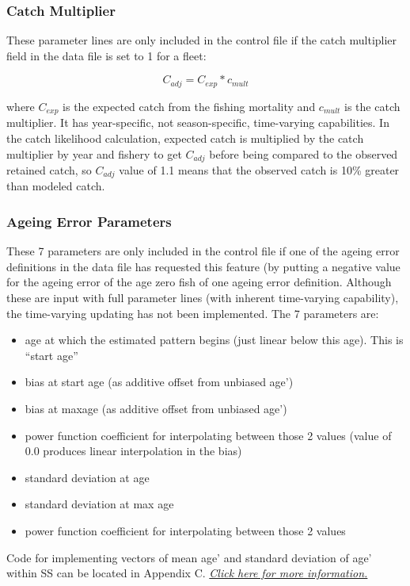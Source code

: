 \subsubsection{Catch Multiplier}
These  parameter lines are only included in the control file if the catch multiplier field in the data file is set to 1 for a fleet:

\begin{equation}
C_{adj} = C_{exp} * c_{mult}
\end{equation}

\noindent where $C_{exp}$ is the expected catch from the fishing mortality and $c_{mult}$ is the catch multiplier. It has year-specific, not season-specific, time-varying capabilities.  In the catch likelihood calculation, expected catch is multiplied by the catch multiplier by year and fishery to get $C_{adj}$ before being compared to the observed retained catch, so $C_{adj}$ value of 1.1 means that the observed catch is 10\% greater than modeled catch.

\subsubsection{Ageing Error Parameters}
These 7 parameters are only included in the control file if one of the ageing error definitions in the data file has requested this feature (by putting a negative value for the ageing error of the age zero fish of one ageing error definition.  Although these are input with full parameter lines (with inherent time-varying capability), the time-varying updating has not been implemented. The 7 parameters are:
\begin{itemize}
	\item age at which the estimated pattern begins (just linear below this age).  This is “start age”
	\item bias at start age (as additive offset from unbiased age’)
	\item bias at maxage (as additive offset from unbiased age’)
	\item power function coefficient for interpolating between those 2 values (value of 0.0 produces linear interpolation in the bias)
	\item standard deviation at age
	\item standard deviation at max age
	\item power function coefficient for interpolating between those 2 values
\end{itemize}

\noindent Code for implementing vectors of mean age' and standard deviation of age' within SS can be located in Appendix C. \hyperlink{AgeingError}{\textit{Click here for more information.}}


